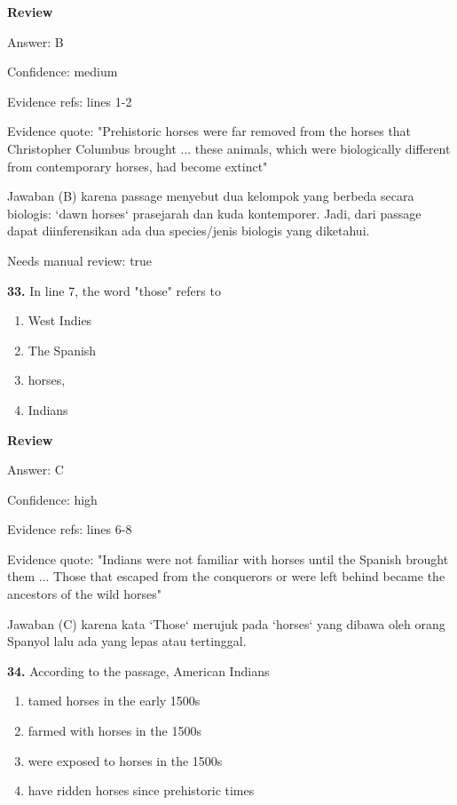 \documentclass[12pt]{article}
\begin{document}
\par
\begingroup
\setlength{\parskip}{0pt}
\setlength{\parindent}{0pt}
\textbf{Review}\par
Answer: B\par
Confidence: medium\par
Evidence refs: lines 1-2\par
Evidence quote: "Prehistoric horses were far removed from the horses that Christopher Columbus brought ... these animals, which were biologically different from contemporary horses, had become extinct"\par
Jawaban (B) karena passage menyebut dua kelompok yang berbeda secara biologis: `dawn horses` prasejarah dan kuda kontemporer. Jadi, dari passage dapat diinferensikan ada dua species/jenis biologis yang diketahui.\par
Needs manual review: true\par
\endgroup
\par
\vspace{0.25\baselineskip}
\noindent\textbf{33.} In line 7, the word "those" refers to
\begin{enumerate}[label=(\Alph*),leftmargin=*,itemsep=0.2em]
\item West Indies
\item The Spanish
\item horses,
\item Indians
\end{enumerate}
\par
\begingroup
\setlength{\parskip}{0pt}
\setlength{\parindent}{0pt}
\textbf{Review}\par
Answer: C\par
Confidence: high\par
Evidence refs: lines 6-8\par
Evidence quote: "Indians were not familiar with horses until the Spanish brought them ... Those that escaped from the conquerors or were left behind became the ancestors of the wild horses"\par
Jawaban (C) karena kata `Those` merujuk pada `horses` yang dibawa oleh orang Spanyol lalu ada yang lepas atau tertinggal.\par
\endgroup
\par
\vspace{0.25\baselineskip}
\noindent\textbf{34.} According to the passage, American Indians
\begin{enumerate}[label=(\Alph*),leftmargin=*,itemsep=0.2em]
\item tamed horses in the early 1500s
\item farmed with horses in the 1500s
\item were exposed to horses in the 1500s
\item have ridden horses since prehistoric times
\end{enumerate}
\end{document}
